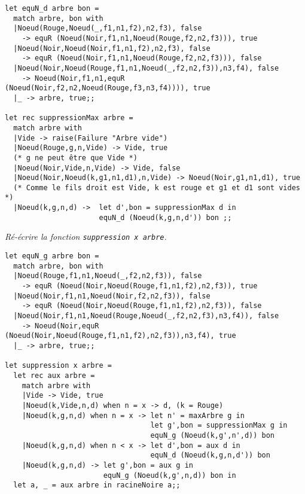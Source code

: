 \begin{Answer}
\begin{lstlisting}
let equN_d arbre bon =
  match arbre, bon with
  |Noeud(Rouge,Noeud(_,f1,n1,f2),n2,f3), false 
    -> equR (Noeud(Noir,f1,n1,Noeud(Rouge,f2,n2,f3))), true
  |Noeud(Noir,Noeud(Noir,f1,n1,f2),n2,f3), false 
    -> equR (Noeud(Noir,f1,n1,Noeud(Rouge,f2,n2,f3))), false
  |Noeud(Noir,Noeud(Rouge,f1,n1,Noeud(_,f2,n2,f3)),n3,f4), false 
    -> Noeud(Noir,f1,n1,equR (Noeud(Noir,f2,n2,Noeud(Rouge,f3,n3,f4)))), true
  |_ -> arbre, true;;

let rec suppressionMax arbre =
  match arbre with
  |Vide -> raise(Failure "Arbre vide")
  |Noeud(Rouge,g,n,Vide) -> Vide, true
  (* g ne peut être que Vide *)
  |Noeud(Noir,Vide,n,Vide) -> Vide, false
  |Noeud(Noir,Noeud(k,g1,n1,d1),n,Vide) -> Noeud(Noir,g1,n1,d1), true
  (* Comme le fils droit est Vide, k est rouge et g1 et d1 sont vides *)
  |Noeud(k,g,n,d) ->  let d',bon = suppressionMax d in
                      equN_d (Noeud(k,g,n,d')) bon ;;
\end{lstlisting}
\end{Answer}
\begin{Exercise}\it Ré-écrire la fonction {\tt suppression x arbre}.
\end{Exercise}
\begin{Answer}
\begin{lstlisting}
let equN_g arbre bon =
  match arbre, bon with
  |Noeud(Rouge,f1,n1,Noeud(_,f2,n2,f3)), false
    -> equR (Noeud(Noir,Noeud(Rouge,f1,n1,f2),n2,f3)), true
  |Noeud(Noir,f1,n1,Noeud(Noir,f2,n2,f3)), false 
    -> equR (Noeud(Noir,Noeud(Rouge,f1,n1,f2),n2,f3)), false
  |Noeud(Noir,f1,n1,Noeud(Rouge,Noeud(_,f2,n2,f3),n3,f4)), false
    -> Noeud(Noir,equR (Noeud(Noir,Noeud(Rouge,f1,n1,f2),n2,f3)),n3,f4), true
  |_ -> arbre, true;;

let suppression x arbre = 
  let rec aux arbre = 
    match arbre with
    |Vide -> Vide, true
    |Noeud(k,Vide,n,d) when n = x -> d, (k = Rouge)
    |Noeud(k,g,n,d) when n = x -> let n' = maxArbre g in
                                  let g',bon = suppressionMax g in
                                  equN_g (Noeud(k,g',n',d)) bon
    |Noeud(k,g,n,d) when n < x -> let d',bon = aux d in
                                  equN_d (Noeud(k,g,n,d')) bon
    |Noeud(k,g,n,d) -> let g',bon = aux g in
                       equN_g (Noeud(k,g',n,d)) bon in
  let a, _ = aux arbre in racineNoire a;;                     
\end{lstlisting}
\end{Answer}

